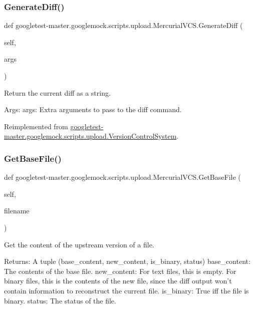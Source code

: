 \subsubsection{\texorpdfstring{GenerateDiff()}{GenerateDiff()}}
{\footnotesize\ttfamily def googletest-\/master.\+googlemock.\+scripts.\+upload.\+Mercurial\+V\+C\+S.\+Generate\+Diff (\begin{DoxyParamCaption}\item[{}]{self,  }\item[{}]{args }\end{DoxyParamCaption})}

\begin{DoxyVerb}Return the current diff as a string.

Args:
  args: Extra arguments to pass to the diff command.
\end{DoxyVerb}
 

Reimplemented from \mbox{\hyperlink{classgoogletest-master_1_1googlemock_1_1scripts_1_1upload_1_1_version_control_system_ac248927b279c72356690eeacfb0e3841}{googletest-\/master.\+googlemock.\+scripts.\+upload.\+Version\+Control\+System}}.

\mbox{\label{classgoogletest-master_1_1googlemock_1_1scripts_1_1upload_1_1_mercurial_v_c_s_a27454e4128398764560054bee78b5ded}} 
\subsubsection{\texorpdfstring{GetBaseFile()}{GetBaseFile()}}
{\footnotesize\ttfamily def googletest-\/master.\+googlemock.\+scripts.\+upload.\+Mercurial\+V\+C\+S.\+Get\+Base\+File (\begin{DoxyParamCaption}\item[{}]{self,  }\item[{}]{filename }\end{DoxyParamCaption})}

\begin{DoxyVerb}Get the content of the upstream version of a file.

Returns:
  A tuple (base_content, new_content, is_binary, status)
base_content: The contents of the base file.
new_content: For text files, this is empty.  For binary files, this is
  the contents of the new file, since the diff output won't contain
  information to reconstruct the current file.
is_binary: True iff the file is binary.
status: The status of the file.
\end{DoxyVerb}
 

